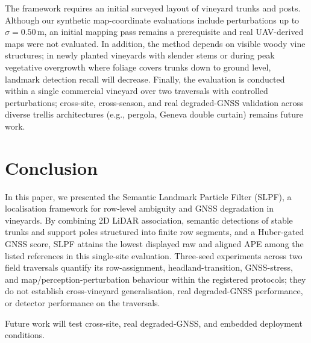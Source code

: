 \documentclass[letterpaper, 10 pt, conference]{ieeeconf}
\begin{document}
The framework requires an initial surveyed layout of vineyard trunks and posts. Although our synthetic map-coordinate evaluations include perturbations up to $\sigma=0.50\,$m, an initial mapping pass remains a prerequisite and real UAV-derived maps were not evaluated. In addition, the method depends on visible woody vine structures; in newly planted vineyards with slender stems or during peak vegetative overgrowth where foliage covers trunks down to ground level, landmark detection recall will decrease. Finally, the evaluation is conducted within a single commercial vineyard over two traversals with controlled perturbations; cross-site, cross-season, and real degraded-GNSS validation across diverse trellis architectures (e.g., pergola, Geneva double curtain) remains future work.

\section{Conclusion}
\label{sec:conclusion}

In this paper, we presented the Semantic Landmark Particle Filter (SLPF), a localisation framework for row-level ambiguity and GNSS degradation in vineyards. By combining 2D LiDAR association, semantic detections of stable trunks and support poles structured into finite row segments, and a Huber-gated GNSS score, SLPF attains the lowest displayed raw and aligned APE among the listed references in this single-site evaluation. Three-seed experiments across two field traversals quantify its row-assignment, headland-transition, GNSS-stress, and map/perception-perturbation behaviour within the registered protocols; they do not establish cross-vineyard generalisation, real degraded-GNSS performance, or detector performance on the traversals.

Future work will test cross-site, real degraded-GNSS, and embedded deployment conditions.

\balance


\end{document}
